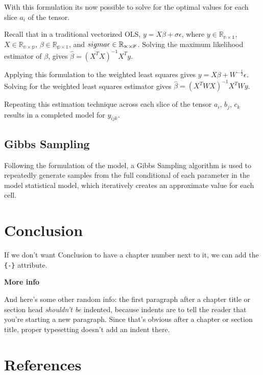 \documentclass[12pt,twoside]{dukestatscithesis}
\theoremstyle{definition}
\theoremstyle{definition}
\theoremstyle{definition}
\theoremstyle{remark}
\begin{document}
With this formulation its now possible to solve for the optimal values
for each slice \(a_i\) of the tensor.

Recall that in a traditional vectorized OLS,
\(y = X\beta + \sigma\epsilon\), where
\(y \in \mathbb{R_{n \times 1}}\), \(X \in \mathbb{R_{n \times p}}\),
\(\beta \in \mathbb{R_{p \times 1}}\), and
\(\\sigma\epsilon \in \mathbb{R_{n \times 1}}\). Solving the maximum
likelihood estimator of \(\beta\), gives
\(\hat \beta = (X^TX)^{-1}X^Ty\).

Applying this formulation to the weighted least squares gives
\(y = X\beta + W^{-\frac{1}{2}}\epsilon\). Solving for the weighted
least squares estimator gives \(\hat \beta = (X^TWX)^{-1}X^TWy\).

Repeating this estimation technique across each slice of the tensor
\(a_i\), \(b_j\), \(c_k\) results in a completed model for \(y_{ijk}\).

\section{Gibbs Sampling}\label{gibbs-sampling-1}

Following the formulation of the model, a Gibbs Sampling algorithm is
used to repeatedly generate samples from the full conditional of each
parameter in the model statistical model, which iteratively creates an
approximate value for each cell.

\chapter*{Conclusion}\label{conclusion}

If we don't want Conclusion to have a chapter number next to it, we can
add the \texttt{\{-\}} attribute.

\textbf{More info}

And here's some other random info: the first paragraph after a chapter
title or section head \emph{shouldn't be} indented, because indents are
to tell the reader that you're starting a new paragraph. Since that's
obvious after a chapter or section title, proper typesetting doesn't add
an indent there.

\backmatter

\chapter*{References}\label{references}
\end{document}
